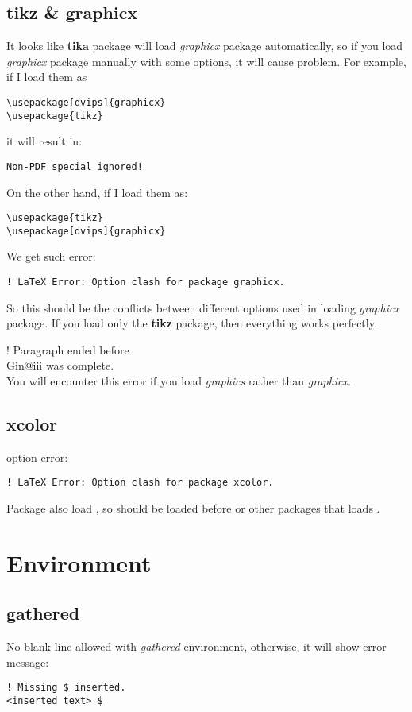\subsection{tikz \& graphicx}
It looks like \textbf{tika} package will load \emph{graphicx} package
automatically, so if you load \emph{graphicx} package manually with some
options, it will cause problem. For example, if I load them as
\begin{verbatim}
\usepackage[dvips]{graphicx}
\usepackage{tikz}
\end{verbatim}
it will result in:
\begin{verbatim}
Non-PDF special ignored!
\end{verbatim}
On the other hand, if I load them as:
\begin{verbatim}
\usepackage{tikz}
\usepackage[dvips]{graphicx}
\end{verbatim}
We get such error:
\begin{verbatim}
! LaTeX Error: Option clash for package graphicx.
\end{verbatim}

So this should be the conflicts between different options used in loading
\emph{graphicx} package. If you load only the \textbf{tikz} package, 
then everything works perfectly.

! Paragraph ended before \\Gin@iii was complete.    \\
You will encounter this error if you load \emph{graphics} rather than \emph{graphicx}.
\subsection{xcolor}
 option error:
\begin{verbatim}
! LaTeX Error: Option clash for package xcolor.
\end{verbatim}
Package  also load , so
 should be loaded before  or 
other packages that loads .

\section{Environment}

\subsection{gathered}
No blank line allowed with \emph{gathered} environment, otherwise, it will show
error message:
\begin{verbatim}
! Missing $ inserted.
<inserted text> $
\end{verbatim}

